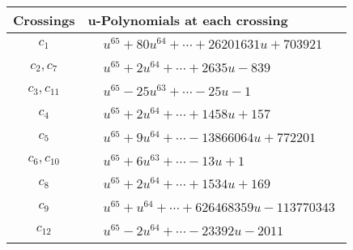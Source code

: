 \documentclass[1p]{elsarticle_modified}
\theoremstyle{definition}
\begin{document}
\begin{tabular}{m{50pt}|m{274pt}}
Crossings & \hspace{64pt}u-Polynomials at each crossing \\
\hline $$\begin{aligned}c_{1}\end{aligned}$$&$\begin{aligned}
&u^{65}+80 u^{64}+\cdots+26201631 u+703921
\end{aligned}$\\
\hline $$\begin{aligned}c_{2},c_{7}\end{aligned}$$&$\begin{aligned}
&u^{65}+2 u^{64}+\cdots+2635 u-839
\end{aligned}$\\
\hline $$\begin{aligned}c_{3},c_{11}\end{aligned}$$&$\begin{aligned}
&u^{65}-25 u^{63}+\cdots-25 u-1
\end{aligned}$\\
\hline $$\begin{aligned}c_{4}\end{aligned}$$&$\begin{aligned}
&u^{65}+2 u^{64}+\cdots+1458 u+157
\end{aligned}$\\
\hline $$\begin{aligned}c_{5}\end{aligned}$$&$\begin{aligned}
&u^{65}+9 u^{64}+\cdots-13866064 u+772201
\end{aligned}$\\
\hline $$\begin{aligned}c_{6},c_{10}\end{aligned}$$&$\begin{aligned}
&u^{65}+6 u^{63}+\cdots-13 u+1
\end{aligned}$\\
\hline $$\begin{aligned}c_{8}\end{aligned}$$&$\begin{aligned}
&u^{65}+2 u^{64}+\cdots+1534 u+169
\end{aligned}$\\
\hline $$\begin{aligned}c_{9}\end{aligned}$$&$\begin{aligned}
&u^{65}+u^{64}+\cdots+626468359 u-113770343
\end{aligned}$\\
\hline $$\begin{aligned}c_{12}\end{aligned}$$&$\begin{aligned}
&u^{65}-2 u^{64}+\cdots-23392 u-2011
\end{aligned}$\\
\hline
\end{tabular}\\~\\
\end{document}

